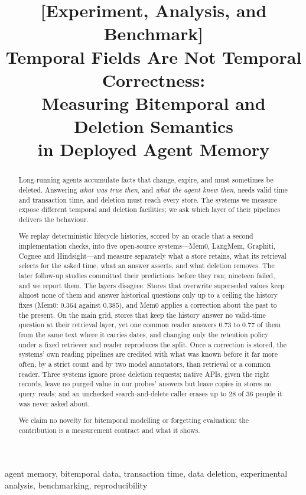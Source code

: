 \documentclass[conference]{IEEEtran}
\title{[Experiment, Analysis, and Benchmark]\\
Temporal Fields Are Not Temporal Correctness:\\
Measuring Bitemporal and Deletion Semantics\\ in Deployed Agent Memory}
\author{\IEEEauthorblockN{Suan Lee}
\IEEEauthorblockA{Semyung University\\
Jecheon, South Korea\\
suanlee@semyung.ac.kr}
\and
\IEEEauthorblockN{Wookey Lee}
\IEEEauthorblockA{Inha University\\
Incheon, Republic of Korea\\
trinity@inha.ac.kr}}
\begin{document}
\maketitle

\begin{abstract}
Long-running agents accumulate facts that change, expire, and must sometimes be
deleted. Answering \emph{what was true then}, and \emph{what the agent knew then},
needs valid time and transaction time, and deletion must reach every store.
The systems we measure expose different temporal and deletion facilities; we
ask which layer of their pipelines delivers the behaviour.

We replay deterministic lifecycle histories, scored by an oracle that a second
implementation checks, into five open-source systems---Mem0, LangMem, Graphiti,
Cognee and Hindsight---and measure separately what a store retains, what its
retrieval selects for the asked time, what an answer asserts, and what deletion
removes. The later follow-up studies committed their predictions before they
ran; nineteen failed, and we report them. The layers disagree. Stores that
overwrite superseded values keep almost none of them and answer historical
questions only up to a ceiling the history fixes (Mem0: 0.364 against 0.385),
and Mem0 applies a correction about the past to the present. On the main grid, stores that keep
the history answer no valid-time question at their retrieval layer, yet one
common reader answers 0.73 to 0.77 of them from the same text where it carries
dates, and changing only the retention policy under a fixed retriever and
reader reproduces the split. Once a correction is stored, the systems' own
reading pipelines are credited with what was known before it far more often,
by a strict count and by two model annotators, than retrieval or a common
reader. Three systems ignore prose deletion requests; native APIs, given the
right records, leave no purged value in our probes' answers but leave copies in
stores no query reads; and an unchecked search-and-delete caller erases up to
28 of 36 people it was never asked about.

We claim no novelty for bitemporal modelling or forgetting evaluation: the
contribution is a measurement contract and what it shows.
\end{abstract}

\begin{IEEEkeywords}
agent memory, bitemporal data, transaction time, data deletion,
experimental analysis, benchmarking, reproducibility
\end{IEEEkeywords}
\end{document}
